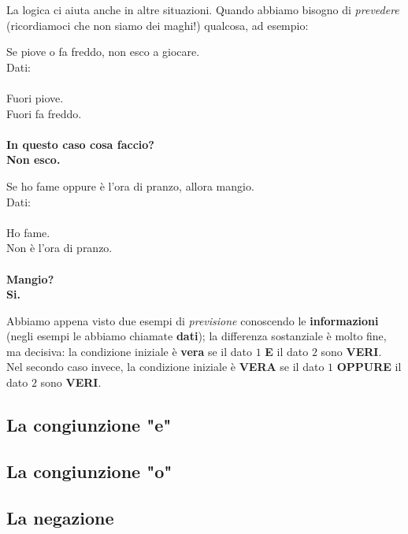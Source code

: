 \documentclass[11pt,fleqn,a5paper]{book} %
\begin{document}
    			La logica ci aiuta anche in altre situazioni. Quando abbiamo bisogno di \textit{prevedere} (ricordiamoci che non siamo dei maghi!) qualcosa, ad esempio:
    			\begin{example}[Previsione]Se piove o fa freddo, non esco a giocare.
    				\\Dati:\\
    				\\Fuori piove.\\Fuori fa freddo.\\
    				\\\textbf{In questo caso cosa faccio?}
    				\\\textbf{Non esco.}
    			\end{example}
    			\begin{example}[Previsione] Se ho fame oppure è l'ora di pranzo, allora mangio.\\
    				Dati:\\
					\\Ho fame.
					\\Non è l'ora di pranzo.\\
    				\\\textbf{Mangio?}
    				\\\textbf{Si.}
    			\end{example}
    		
    			Abbiamo appena visto due esempi di \textit{previsione} conoscendo le \textbf{informazioni} (negli esempi le abbiamo chiamate \textbf{dati}); la differenza sostanziale è molto fine, ma decisiva: la condizione iniziale è \textbf{vera} se il dato $1$ \textbf{E} il dato $2$ sono \textbf{VERI}.\\
    			Nel secondo caso invece, la condizione iniziale è \textbf{VERA} se il dato $1$ \textbf{OPPURE} il dato $2$ sono \textbf{VERI}.
    			
    			\subsection{La congiunzione "e"}
    			\label{sub: La congiunzione "e"}
    			
    				
    			\subsection{La congiunzione "o"}
    			\label{sub: La congiunzione "o"}
    				
    			\subsection{La negazione}
				\label{sub: La negazione"}    			
					
\end{document}
